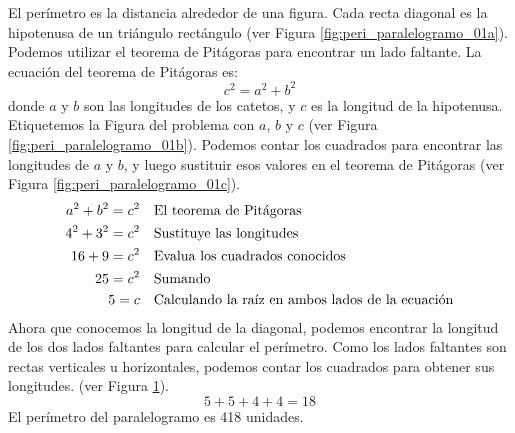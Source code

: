 \begin{solutionbox}{14cm}
\begin{minipage}{0.4\textwidth}
\begin{multicols}{2}
\begin{figure}[H]
                \caption{}
                \label{fig:peri_paralelogramo_01d}
            \end{figure}
        \end{multicols}
    \end{minipage}\hfill
    \begin{minipage}{0.5\textwidth}
        El perímetro es la distancia alrededor de una figura.
        Cada recta diagonal es la hipotenusa de un triángulo rectángulo (ver Figura \ref{fig:peri_paralelogramo_01a}).
        Podemos utilizar el teorema de Pitágoras para encontrar un lado faltante.
        La ecuación del teorema de Pitágoras es:
        \[c^2=a^2+b^2\]
        donde $a$ y $b$ son las longitudes de los catetos, y $c$ es la longitud de la hipotenusa.
        Etiquetemos la Figura del problema con $a$, $b$ y $c$ (ver Figura \ref{fig:peri_paralelogramo_01b}).
        Podemos contar los cuadrados para encontrar las longitudes de $a$ y $b$, y luego sustituir esos valores en el teorema de Pitágoras (ver Figura \ref{fig:peri_paralelogramo_01c}).
        \begin{align*}
            a^2+b^2  =c^2 & \text{\quad El teorema de Pitágoras}                          \\
            4^2+3^2  =c^2 & \text{\quad Sustituye las longitudes}                         \\
            16 +9 =c^2    & \text{\quad Evalua los cuadrados conocidos}                   \\
            25=c^2        & \text{\quad Sumando }                                         \\
            5=c           & \text{\quad Calculando la raíz en ambos lados de la ecuación} \\
        \end{align*}
        Ahora que conocemos la longitud de la diagonal, podemos encontrar la longitud de los dos lados faltantes para calcular el perímetro.
        Como los lados faltantes son rectas verticales u horizontales, podemos contar los cuadrados para obtener sus longitudes. (ver Figura \ref{fig:peri_paralelogramo_01d}).
        \[5+5+4+4=18\]
        El perímetro del paralelogramo es 418 unidades.
    \end{minipage}
\end{solutionbox}
